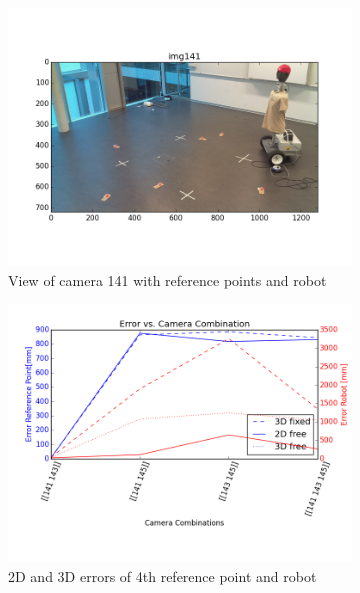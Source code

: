 \begin{figure}[H]
    \centering
    \begin{subfigure}{0.49\linewidth}
        \includegraphics[width=\linewidth]{files/res1_img141.png}
        \caption{View of camera 141 with reference points and robot}
    \end{subfigure}
    \begin{subfigure}{0.49\linewidth}
        \includegraphics[width=\linewidth]{files/res1_combi_4.png}
        \caption{2D and 3D errors of 4th reference point and robot}
    \end{subfigure}
    \begin{subfigure}{0.6\linewidth}

\end{subfigure}
\end{figure}
